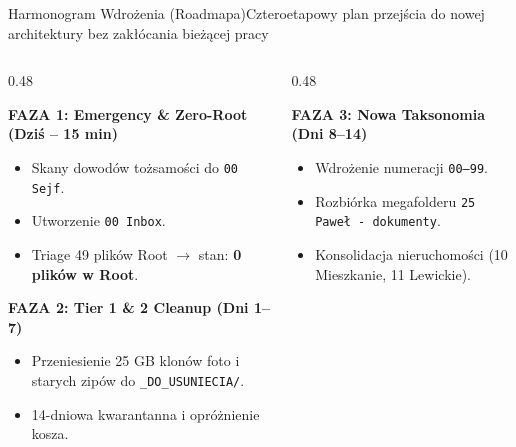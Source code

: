 \documentclass[aspectratio=169, 10pt]{beamer}
\begin{document}
\begin{frame}{Harmonogram Wdrożenia (Roadmapa)}{Czteroetapowy plan przejścia do nowej architektury bez zakłócania bieżącej pracy}
  \begin{columns}[T]
    \begin{column}{0.48\textwidth}
      \begin{alertblock}{\textbf{FAZA 1: Emergency \& Zero-Root (Dziś -- 15 min)}}
        \footnotesize
        \begin{itemize}
          \item Skany dowodów tożsamości do \texttt{00 Sejf}.
          \item Utworzenie \texttt{00 Inbox}.
          \item Triage 49 plików Root $\rightarrow$ stan: \textbf{0 plików w Root}.
        \end{itemize}
      \end{alertblock}

      \vspace{0.2cm}
      \begin{block}{\textbf{FAZA 2: Tier 1 \& 2 Cleanup (Dni 1--7)}}
        \footnotesize
        \begin{itemize}
          \item Przeniesienie 25 GB klonów foto i starych zipów do \texttt{\_DO\_USUNIECIA/}.
          \item 14-dniowa kwarantanna i opróżnienie kosza.
        \end{itemize}
      \end{block}
    \end{column}

    \begin{column}{0.48\textwidth}
      \begin{block}{\textbf{FAZA 3: Nowa Taksonomia (Dni 8--14)}}
        \footnotesize
        \begin{itemize}
          \item Wdrożenie numeracji \texttt{00--99}.
          \item Rozbiórka megafolderu \texttt{25 Paweł - dokumenty}.
          \item Konsolidacja nieruchomości (10 Mieszkanie, 11 Lewickie).
        \end{itemize}
      \end{block}


\end{column}
\end{columns}
\end{frame}
\end{document}
